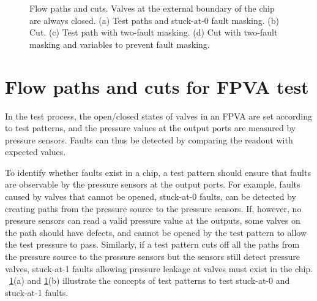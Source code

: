 \begin{figure}[t]
{\figurefontsize
\centering

\caption{Flow paths and cuts. Valves at the external boundary of the chip
are always closed. (a) Test paths and stuck-at-0 fault masking. (b) Cut.
(c) Test path with two-fault masking. (d) Cut with two-fault masking and
variables to prevent fault masking.}
\label{fig:path_cutset}
}
\end{figure}


\section{Flow paths and cuts for FPVA test} %
\label{sec:test_strategy}

In the test process, the open/closed states of valves in an FPVA are set
according to test patterns,
and the pressure values at the output ports are measured by 
pressure sensors. Faults can thus be detected by comparing the readout
with expected values.


To identify whether faults exist in a chip, a test pattern should ensure
that faults are observable by the pressure sensors at the output ports.
For example, faults caused by valves that cannot be opened, stuck-at-0 faults, 
can be detected by creating paths from the pressure source to the pressure
sensors. If, however, no pressure sensors can read a valid pressure value at
the outputs, some valves on the path should have defects, and cannot
be opened by the test pattern to allow the test pressure to pass. 
Similarly, if a test pattern 
cuts off all the paths 
from the pressure source to the pressure sensors but 
the sensors still detect pressure valves, 
stuck-at-1 faults allowing pressure leakage at valves must exist in the chip.
\figname~\ref{fig:path_cutset}(a) and \ref{fig:path_cutset}(b) 
illustrate the concepts of test patterns to
test stuck-at-0 and stuck-at-1 faults.

